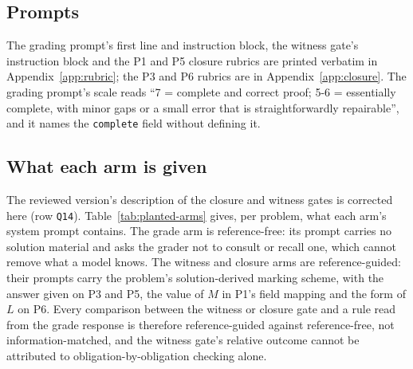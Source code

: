 \begin{table}[htbp]
  \caption{The five disputed labels (\texttt{DEVIATIONS.md}), with each rule's decision, both graders required: pass mark, strict mark and completeness flag as first run / re-query; the witness gate ran once. \CRacc\ accept, \CRrej\ reject. ``post-v12'' and ``post-v15'' name internal model-run reviews before submission.}
  \label{tab:planted-disputed}
  \centering
  \CRfit{}
\end{table}

\subsection{Prompts}
\label{app:planted-prompts}
The grading prompt's first line and instruction block, the witness gate's instruction block and the P1 and P5 closure rubrics are printed verbatim in Appendix~\ref{app:rubric}; the P3 and P6 rubrics are in Appendix~\ref{app:closure}. The grading prompt's scale reads ``7 = complete and correct proof; 5-6 = essentially complete, with minor gaps or a small error that is straightforwardly repairable'', and it names the \texttt{complete} field without defining it.

\subsection{What each arm is given}
\label{app:planted-arms}
The reviewed version's description of the closure and witness gates is corrected here (row \texttt{Q14}). Table~\ref{tab:planted-arms} gives, per problem, what each arm's system prompt contains. The grade arm is reference-free: its prompt carries no solution material and asks the grader not to consult or recall one, which cannot remove what a model knows. The witness and closure arms are reference-guided: their prompts carry the problem's solution-derived marking scheme, with the answer given on P3 and P5, the value of $M$ in P1's field mapping and the form of $L$ on P6. Every comparison between the witness or closure gate and a rule read from the grade response is therefore reference-guided against reference-free, not information-matched, and the witness gate's relative outcome cannot be attributed to obligation-by-obligation checking alone.

